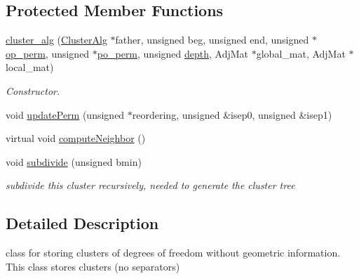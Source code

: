 \subsection*{\-Protected \-Member \-Functions}
\begin{DoxyCompactItemize}
\item 
\hyperlink{classcluster__alg_ae9955a23c000cde86b67d662c06912f1}{cluster\-\_\-alg} (\hyperlink{classClusterAlg}{\-Cluster\-Alg} $\ast$father, unsigned beg, unsigned end, unsigned $\ast$\hyperlink{classClusterAlg_a4f06e1465978072d8c6bd098e062b701}{op\-\_\-perm}, unsigned $\ast$\hyperlink{classClusterAlg_af3d1d7c4ae0516ff9de725d3ff760b07}{po\-\_\-perm}, unsigned \hyperlink{classClusterAlg_ac06ccb0ba85be10e97392bd063fa78c8}{depth}, \-Adj\-Mat $\ast$global\-\_\-mat, \-Adj\-Mat $\ast$local\-\_\-mat)
\begin{DoxyCompactList}\small\item\em \-Constructor. \end{DoxyCompactList}\item 
void \hyperlink{classcluster__alg_a289d2fce6fba6f3452468a99d6a81ff3}{update\-Perm} (unsigned $\ast$reordering, unsigned \&isep0, unsigned \&isep1)
\item 
virtual void \hyperlink{classcluster__alg_a78292c11a717fb5b83762fc4c070797f}{compute\-Neighbor} ()
\item 
void \hyperlink{classcluster__alg_a411de6be2059e0c2848c4b11f9a043cf}{subdivide} (unsigned bmin)
\begin{DoxyCompactList}\small\item\em subdivide this cluster recursively, needed to generate the cluster tree \end{DoxyCompactList}\end{DoxyCompactItemize}


\subsection{\-Detailed \-Description}
class for storing clusters of degrees of freedom without geometric information. \-This class stores clusters (no separators) 

